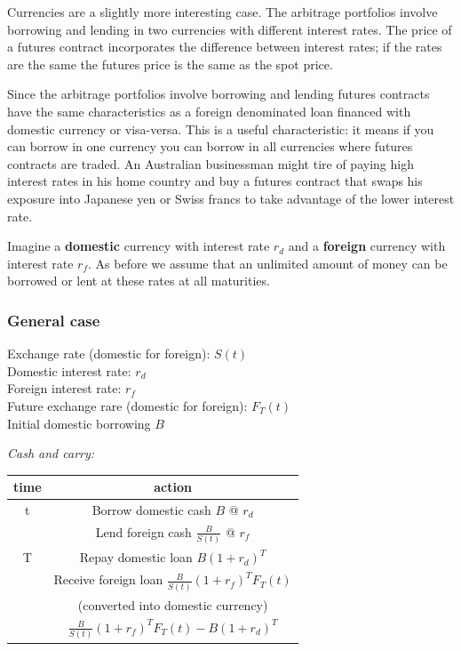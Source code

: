 Currencies are a slightly more interesting case. The arbitrage portfolios involve borrowing and lending in two currencies with different interest rates. The price of a futures contract incorporates the difference between interest rates; if the rates are the same the futures price is the same as the spot price.

Since the arbitrage portfolios involve borrowing and lending futures contracts have the same characteristics as a foreign denominated loan financed with domestic currency or visa-versa. This is a useful characteristic: it means if you can borrow in one currency you can borrow in all currencies where futures contracts are traded. An Australian businessman might tire of paying high interest rates in his home country and buy a futures contract that swaps his exposure into Japanese yen or Swiss francs to take advantage of the lower interest rate. 

Imagine a \textbf{domestic} currency with interest rate $r_d$ and a \textbf{foreign} currency with interest rate $r_f$. As before we assume that an unlimited amount of money can be borrowed or lent at these rates at all maturities.  

\subsubsection{General case}


Exchange rate (domestic for foreign): $S(t)$\\
Domestic interest rate: $r_d$\\
Foreign interest rate: $r_f$\\
Future exchange rare (domestic for foreign): $F_T(t)$\\
Initial domestic borrowing $B$

\textit{Cash and carry:}

\begin{center} \begin{tabular}{|c|c|}
  \hline
  time & action \\
  \hline
   t & Borrow domestic cash $B$ @ $r_d$ \\
    & Lend foreign cash $\frac{B}{S(t)}$ @ $r_f$  \\
  \hline
 T & Repay domestic loan $B(1+r_d)^{T}$ \\
   & Receive foreign loan $\frac{B}{S(t)}(1+r_f)^{T}F_T(t)$   \\
   & (converted into domestic currency)\\
  \hline
   & $\frac{B}{S(t)}(1+r_f)^{T}F_T(t)-B(1+r_d)^{T}$\\
  \hline
\end{tabular}\end{center}

